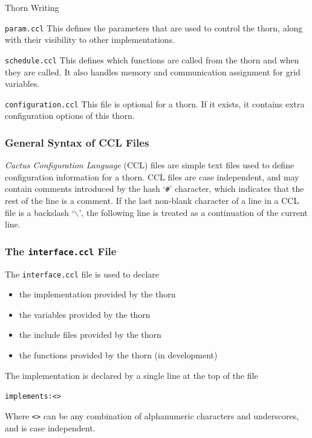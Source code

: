 \begin{cactuspart}{Thorn Writing}
\begin{Lentry}
\item [\texttt{param.ccl}]
This defines the parameters that are used to control the thorn, along
with their visibility to other implementations.

\item [\texttt{schedule.ccl}]
This defines which functions are called from the thorn and when they are
called. It also handles memory and communication assignment for grid variables.

\item [\texttt{configuration.ccl}]
This file is optional for a thorn. If it exists, it contains extra
configuration options of this thorn.

\end{Lentry}

\subsubsection{General Syntax of CCL Files}

\textit{Cactus Configuration Language} (CCL) files are simple text files
used to define configuration information for a thorn.  CCL files are
case independent, and may contain comments introduced by the hash `\texttt{\#}'
character, which indicates that the rest of the line is a comment. If the last
non-blank character of a line in a CCL file is a backslash
`\texttt{$\backslash$}', the
following line is treated as a continuation of the current line.

\subsubsection{The \texttt{interface.ccl} File}
\label{subsec:interface_ccl}

The \texttt{interface.ccl} file is used to declare

\begin{itemize}
\item the implementation provided by the thorn
\item the variables provided by the thorn
\item the include files provided by the thorn
\item the functions provided by the thorn (in development)
\end{itemize}


The implementation is declared by a single line at the top of the file
\begin{alltt}
implements: <>
\end{alltt}
Where \texttt{<>} can be any combination of alphanumeric
characters and underscores, and is case independent.


\end{cactuspart}
